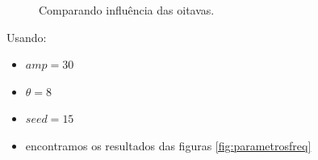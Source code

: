 \begin{figure}[H]
     \centering
     \hspace{0.1cm}
     \hspace{0.1cm}
     \caption{Comparando influência das oitavas.}
     \label{fig:parametrosOctaves}
\end{figure}

Usando:
\begin{itemize}
    \item $amp = 30$
    \item $\theta = 8$
    \item $seed = 15$
    \item encontramos os resultados das figuras \ref{fig:parametrosfreq}
\end{itemize}

